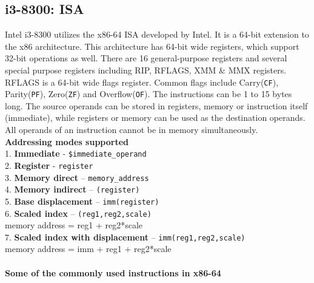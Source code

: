 \documentclass[a4paper,11pt]{article}
\begin{document}
\subsection{i3-8300: ISA}
Intel i3-8300 utilizes the x86-64 ISA developed by Intel. It is a 64-bit extension to the x86 architecture. This architecture has 64-bit wide registers, which support 32-bit operations as well. There are 16 general-purpose registers and several special purpose registers including RIP, RFLAGS, XMM \& MMX registers. RFLAGS is a 64-bit wide flags register. Common flags include Carry({\tt CF}), Parity({\tt PF}), Zero({\tt ZF}) and Overflow({\tt OF}). The instructions can be 1 to 15 bytes long. The source operands can be stored in registers, memory or instruction itself (immediate), while registers or memory can be used as the destination operands. All operands of an instruction cannot be in memory simultaneously.\\
\textbf{Addressing modes supported\cite{x64asm}}\\
1. \textbf{Immediate} - {\tt \$immediate\_operand}\\
2. \textbf{Register} - {\tt register}\\
3. \textbf{Memory direct} – {\tt memory\_address}\\
4. \textbf{Memory indirect} – {\tt (register)}\\
5. \textbf{Base displacement} – {\tt imm(register)}\\
6. \textbf{Scaled index} – {\tt (reg1,reg2,scale)}\\
memory address = reg1 + reg2*scale\\
7. \textbf{Scaled index with displacement} – {\tt imm(reg1,reg2,scale)}\\
memory address = imm + reg1 + reg2*scale\\\\
\textbf{Some of the commonly used instructions in x86-64}\cite{i3dev}\\
\end{document}
